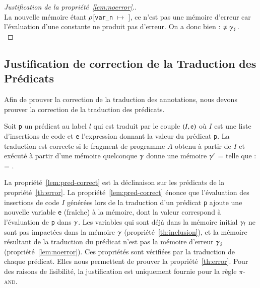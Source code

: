 \begin{proof}[Justification de la propriété~\ref{lem:noerror}.]~\\
  La nouvelle mémoire étant
  $\rho$[\lstinline'var_n' $\mapsto$ ], ce
  n'est pas
  une mémoire d'erreur car l'évaluation d'une constante ne produit pas
  d'erreur.
  On a donc bien :
  $\neq \gamma_\lightning$.
  ~\\
\end{proof}


\subsection{Justification de correction de la Traduction des Prédicats}
\label{sec:predicate-translation}


Afin de prouver la correction de la traduction des annotations,
nous devons prouver la correction de la traduction des prédicats.

\begin{myproperty}
  \label{lem:pred-correct}
  Soit \lstinline'p' un prédicat au label $l$ qui est
  traduit par le couple $(I, \mbox{\lstinline'e'})$ où $I$ est une liste
  d'insertions de code et \lstinline'e' l'expression donnant la valeur du
  prédicat \lstinline'p'.
  La traduction est correcte si le fragment de programme $A$ obtenu à partir de
  $I$ et exécuté à partir d'une mémoire quelconque $\gamma$ donne une
  mémoire $\gamma'$ =  telle que :
   = .
\end{myproperty}

La propriété~\ref{lem:pred-correct} est la déclinaison sur les prédicats de la
propriété~\ref{th:error}.
La propriété~\ref{lem:pred-correct} énonce que l'évaluation des insertions de
code $I$ générées lors de la traduction d'un prédicat \lstinline'p' ajoute une
nouvelle variable \lstinline'e' (fraîche) à la mémoire, dont la
valeur correspond à l'évaluation de \lstinline'p' dans $\gamma$.
Les variables qui sont déjà dans la mémoire initial $\gamma_l$ ne sont pas
impactées dans la mémoire $\gamma$ (propriété~\ref{th:inclusion}), et
la mémoire résultant de la traduction du prédicat n'est pas la mémoire
d'erreur $\gamma_\lightning$ (propriété~\ref{lem:noerror}).
Ces propriétés sont vérifiées par la traduction de chaque prédicat.
Elles nous permettent de prouver la propriété~\ref{th:error}.
Pour des raisons de lisibilité, la justification est uniquement fournie pour la
règle \textsc{$\pi$-and}.%


